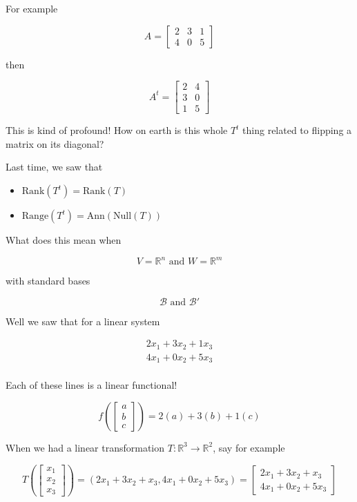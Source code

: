 \documentclass[12pt]{article}
\def\R{{\mathbb R}}
\newcommand{\rank}{\mathrm{Rank}}
\def\Ann{\text{Ann}}
\def\B{\mathcal B}
\def\range{\text{Range}}
\def\Null{\text{Null}}
\begin{document}
  For example

  \[
    A = \begin{bmatrix}
      2 & 3 & 1 \\
      4 & 0 & 5
    \end{bmatrix}
  \]

  then

  \[
    A^t = \begin{bmatrix}
      2 & 4 \\
      3 & 0 \\
      1 & 5
    \end{bmatrix}
  \]

  This is kind of profound! How on earth is this whole $T^t$ thing related to
  flipping a matrix on its diagonal?


  Last time, we saw that

  \begin{itemize}
    \item $\rank(T^t) = \rank(T)$
    \item $\range(T^t) = \Ann(\Null(T))$
  \end{itemize}

  What does this mean when

  \[
    V = \R^n \text{ and } W = \R^m
  \]

  with standard bases

  \[
    \B \text{ and } \B'
  \]

  Well we saw that for a linear system

  \begin{align*}
    2x_1 + 3x_2 + 1x_3 \\
    4x_1 + 0x_2 + 5x_3 \\
  \end{align*}

  Each of these lines is a linear functional!

  \[
    f\left(\begin{bmatrix} a \\ b \\ c \end{bmatrix}\right) = 2(a) + 3(b) + 1(c)
  \]

  When we had a linear transformation $T: \R^3 \to \R^2$, say for example

  \[
    T\left(\begin{bmatrix} x_1 \\ x_2 \\ x_3 \end{bmatrix}\right) = (2x_1 + 3x_2
    + x_3, 4x_1 + 0x_2 + 5x_3) = \begin{bmatrix}
      2x_1 + 3x_2 + x_3 \\
      4x_1 + 0x_2 + 5x_3
    \end{bmatrix}
  \]
\end{document}
